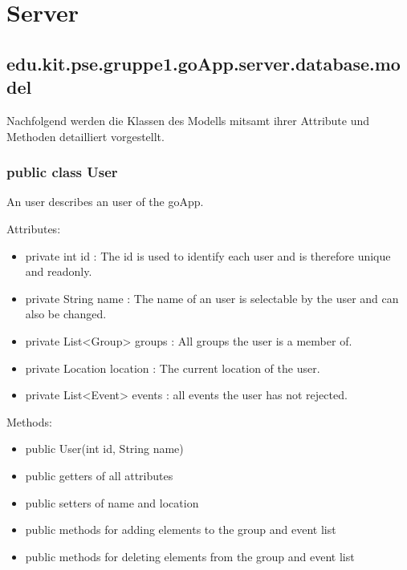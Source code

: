 
\section{Server}
	
	\hypertarget{database.model}{}
	\hypertarget{ServerModel}{}
	\subsection{edu.kit.pse.gruppe1.goApp.server.database.model}
Nachfolgend werden die Klassen des Modells mitsamt ihrer Attribute und Methoden detailliert vorgestellt.
	\subsubsection{public class User}
	An user describes an user of the goApp.
	
	Attributes:
	\begin{itemize}
	\item private int id : The id is used to identify each user and is therefore unique and readonly.
	\item private String name : The name of an user is selectable by the user and can also be changed.
	\item private List<Group> groups : All groups the user is a member of.
	\item private Location location : The current location of the user.
	\item private List<Event> events : all events the user has not rejected.
	\end{itemize}
	Methods: 
	\begin{itemize}
	\item public User(int id, String name)
	\item public getters of all attributes
	\item public setters of name and location
	\item public methods for adding elements to the group and event list
	\item public methods for deleting elements from the group and event list
	\end{itemize}


